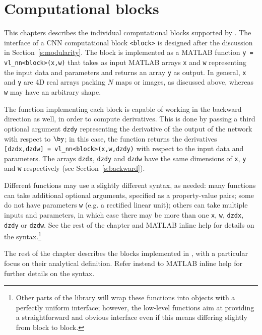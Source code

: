 \chapter{Computational blocks}\label{s:blocks}

This chapters describes the individual computational blocks supported by \vlnn. The interface of a CNN computational block \verb!<block>! is designed after the discussion in Section~\ref{s:modularity}. The block is implemented as a MATLAB function \verb!y = vl_nn<block>(x,w)! that takes as input MATLAB arrays \verb!x! and \verb!w! representing the input data and parameters and returns an array \verb!y! as output. In general, \verb!x! and \verb!y! are 4D real arrays packing $N$ maps or images, as discussed above, whereas \verb!w! may have an arbitrary shape.

The function implementing each block is capable of working in the backward direction as well, in order to compute derivatives. This is done by passing a third optional argument \verb!dzdy! representing the derivative of the output of the network with respect to $\by$; in this case, the function returns the derivatives \verb![dzdx,dzdw] = vl_nn<block>(x,w,dzdy)! with respect to the input data and parameters. The arrays \verb!dzdx!, \verb!dzdy! and \verb!dzdw! have the same dimensions of \verb!x!, \verb!y! and \verb!w! respectively (see Section~\ref{s:backward}).

Different functions may use a slightly different syntax, as needed: many functions can take additional optional arguments, specified as a property-value pairs; some do not have parameters  \verb!w! (e.g. a rectified linear unit); others can take multiple inputs and parameters, in which case there may be more than one \verb!x!, \verb!w!, \verb!dzdx!, \verb!dzdy! or \verb!dzdw!. See the rest of the chapter and MATLAB inline help for details on the syntax.\footnote{Other parts of the library will wrap these functions into objects with a perfectly uniform interface; however, the low-level functions aim at providing a straightforward and obvious interface even if this means differing slightly from block to block.}

The rest of the chapter describes the blocks implemented in \vlnn, with a particular focus on their analytical definition. Refer instead to MATLAB inline help for further details on the syntax.

